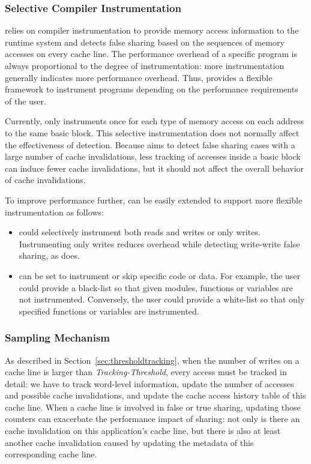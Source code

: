 \subsubsection{Selective Compiler Instrumentation}
\label{sec:selectinstrumentation}

\Predator{} relies on compiler instrumentation to provide memory access information to the runtime system 
and detects false sharing based on the sequences of memory accesses on every cache line. 
The performance overhead of a specific program is always proportional to the degree of instrumentation: more instrumentation generally indicates more performance overhead. 
Thus, \Predator{} provides a flexible framework to instrument programs depending on the performance requirements of the user.

Currently, \Predator{} only instruments once for each type of memory access on each address 
to the same basic block. 
This selective instrumentation does not normally affect the effectiveness of detection. 
Because \Predator{} aims to detect false sharing cases with a large number of cache invalidations,
less tracking of accesses inside a basic block can induce fewer cache invalidations, but it should not affect the overall behavior of cache invalidations. 

To improve performance further,
\Predator{} can be easily extended to support more flexible instrumentation as follows:
\begin{itemize}
\item
\Predator{} could selectively instrument both reads and writes or only writes.
Instrumenting only writes reduces overhead while detecting write-write false sharing, 
as \Sheriff{} does. 
\item
\Predator{} can be set to instrument or skip specific code or data. 
For example, the user could provide a black-list so that given modules,
functions or variables are not instrumented. 
Conversely, the user could provide a white-list so that only specified functions or variables are instrumented. 
\end{itemize}

\subsubsection{Sampling Mechanism}
\label{sec:sample}
As described in Section~\ref{sec:thresholdtracking}, when the number of writes on a cache line is larger than {\it Tracking-Threshold}, every
access must be tracked in detail: we have to track word-level 
information, update the number of accesses and possible cache invalidations, and update the cache access history table
of this cache line.  When a cache line is involved in false or true sharing, updating those counters can exacerbate the performance impact of sharing: not only is there an cache invalidation on this application's cache line, but there is also at least another cache invalidation caused by updating the metadata of this corresponding cache line.

